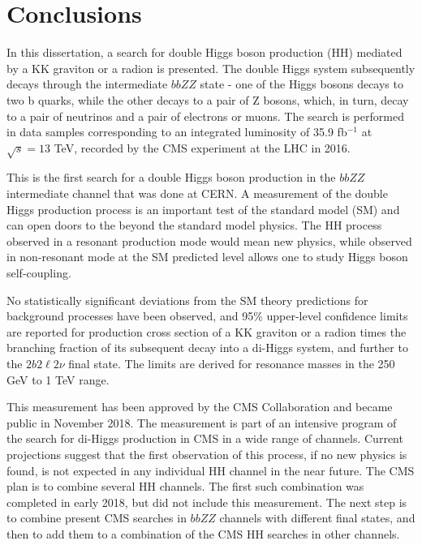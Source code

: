 \chapter{Conclusions}
\label{ch:Conclusions}

In this dissertation, a search for double Higgs boson production (HH) mediated by a KK graviton or a radion is presented. The double Higgs system subsequently decays through the intermediate $bbZZ$ state - one of the Higgs bosons decays to two b quarks, while the other decays to a pair of Z bosons, which, in turn, decay to a pair of neutrinos and a pair of electrons or muons. The search is performed in data samples corresponding to an integrated luminosity of 35.9 fb$^{-1}$ at $\sqrt s =13$ TeV, recorded by the CMS experiment at the LHC in 2016. 

This is the first search for a double Higgs boson production in the $bbZZ$ intermediate channel that was done at CERN. A measurement of the double Higgs production process is an important test of the standard model (SM) and can open doors to the beyond the standard model physics. The HH process observed in a resonant production mode would mean new physics, while observed in non-resonant mode at the SM predicted level allows one to study Higgs boson self-coupling. 

No statistically significant deviations from the SM theory predictions for background processes have been observed, and 95\% upper-level confidence limits are reported for production cross section of a KK graviton or a radion times the branching fraction of its subsequent decay into a di-Higgs system, and further to the $2 b 2 \ell 2 \nu$ final state. The limits are derived for resonance masses in the 250 GeV to 1 TeV range.

This measurement has been approved by the CMS Collaboration and became public in November 2018. The measurement is part of an intensive program of the search for di-Higgs production in CMS in a wide range of channels. Current projections suggest that the first observation of this process, if no new physics is found, is not expected in any individual HH channel in the near future. The CMS plan is to combine several HH channels. The first such combination was completed in early 2018, but did not include this measurement. The next step is to combine present CMS searches in $bbZZ$ channels with different final states, and then to add them to a combination of the CMS HH searches in other channels.
